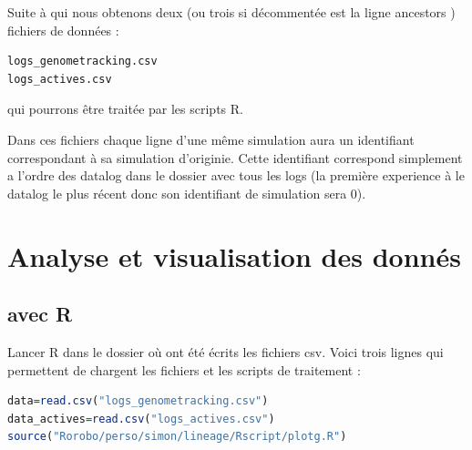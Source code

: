 \documentclass[a4paper,10pt]{report}
\begin{document}
Suite à qui nous obtenons deux (ou trois si décommentée est la ligne ancestors ) fichiers de données : 
\begin{lstlisting}[language=bash]
logs_genometracking.csv
logs_actives.csv
\end{lstlisting}
qui pourrons être traitée par les scripts R.

Dans ces fichiers chaque ligne d'une même simulation aura un identifiant correspondant à sa simulation d'originie. Cette identifiant correspond simplement a l'ordre des datalog dans le dossier avec tous les logs (la première experience à le datalog le plus récent donc son identifiant de simulation sera 0).
\section{Analyse et visualisation des donnés}
\subsection{avec R}
\label{sec:visualisation}
Lancer R dans le dossier où ont été écrits les fichiers csv.
Voici trois lignes qui permettent de chargent les fichiers et les scripts de traitement :
\begin{lstlisting}[language=R]
data=read.csv("logs_genometracking.csv")
data_actives=read.csv("logs_actives.csv")
source("Rorobo/perso/simon/lineage/Rscript/plotg.R")
\end{lstlisting}
\end{document}
